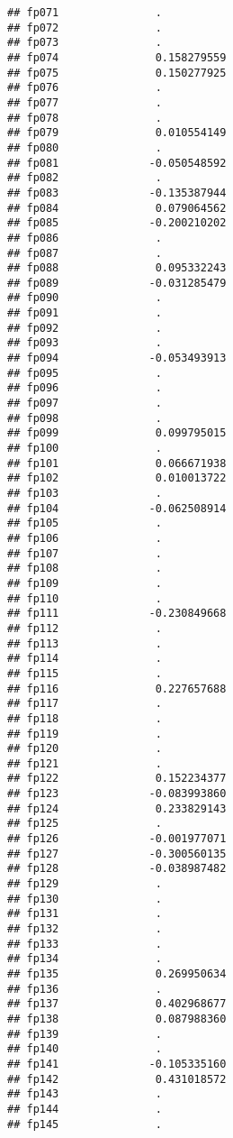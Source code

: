 \documentclass[]{article}
\begin{document}
\begin{verbatim}
## fp071               .          
## fp072               .          
## fp073               .          
## fp074               0.158279559
## fp075               0.150277925
## fp076               .          
## fp077               .          
## fp078               .          
## fp079               0.010554149
## fp080               .          
## fp081              -0.050548592
## fp082               .          
## fp083              -0.135387944
## fp084               0.079064562
## fp085              -0.200210202
## fp086               .          
## fp087               .          
## fp088               0.095332243
## fp089              -0.031285479
## fp090               .          
## fp091               .          
## fp092               .          
## fp093               .          
## fp094              -0.053493913
## fp095               .          
## fp096               .          
## fp097               .          
## fp098               .          
## fp099               0.099795015
## fp100               .          
## fp101               0.066671938
## fp102               0.010013722
## fp103               .          
## fp104              -0.062508914
## fp105               .          
## fp106               .          
## fp107               .          
## fp108               .          
## fp109               .          
## fp110               .          
## fp111              -0.230849668
## fp112               .          
## fp113               .          
## fp114               .          
## fp115               .          
## fp116               0.227657688
## fp117               .          
## fp118               .          
## fp119               .          
## fp120               .          
## fp121               .          
## fp122               0.152234377
## fp123              -0.083993860
## fp124               0.233829143
## fp125               .          
## fp126              -0.001977071
## fp127              -0.300560135
## fp128              -0.038987482
## fp129               .          
## fp130               .          
## fp131               .          
## fp132               .          
## fp133               .          
## fp134               .          
## fp135               0.269950634
## fp136               .          
## fp137               0.402968677
## fp138               0.087988360
## fp139               .          
## fp140               .          
## fp141              -0.105335160
## fp142               0.431018572
## fp143               .          
## fp144               .          
## fp145               .          

\end{verbatim}
\end{document}
